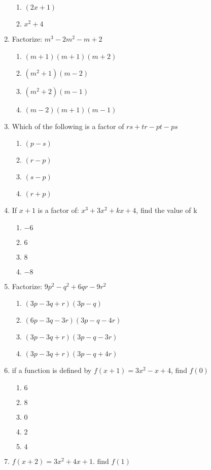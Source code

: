 \begin{multicols}{2}
\begin{enumerate}[label={\arabic*.}]
\begin{enumerate}[label={\Alph*.}]
	\item \((2x+1)\)
	\item \({x}^{2}+4\)
	\end{enumerate}
\item Factorize: \(m^3-2m^2-m+2\)
	\begin{enumerate}[label={\Alph*.}]
	\item \((m+1)(m+1)(m+2)\)
	\item \((m^2+1)(m-2)\)
	\item \((m^2+2)(m-1)\)
	\item \((m-2)(m+1)(m-1)\)
	\end{enumerate}
\item Which of the following is a factor of \(rs+tr-pt-ps\)
	\begin{enumerate}[label={\Alph*.}]
	\item \((p-s)\)
	\item \((r-p)\)
	\item \((s-p)\)
	\item \((r+p)\)
	\end{enumerate}
\item If \(x+1\) is a factor of: \({x}^{3}+3{x}^{2}+kx+4\), find the value of k
	\begin{enumerate}[label={\Alph*.}]
	\item \(-6\)
	\item \(6\)
	\item \(8\)
	\item \(-8\)
	\end{enumerate}
\item Factorize: \(9p^2-q^2+6qr-9r^2\)
	\begin{enumerate}[label={\Alph*.}]
	\item \((3p-3q+r)(3p-q)\)
	\item \((6p-3q-3r)(3p-q-4r)\)
	\item \((3p-3q+r)(3p-q-3r)\)
	\item \((3p-3q+r)(3p-q+4r)\)
	\end{enumerate}
\item if a function is defined by $f(x+1) = 3x^2-x+4$, find $f(0)$
	\begin{enumerate}[label={\Alph*.}]
	\item \(6\)
	\item \(8\)
	\item \(0\)
	\item \(2\)
	\item \(4\)
	\end{enumerate}
\item $f(x+2) = 3x^2 + 4x + 1$. find $f(1)$

\end{enumerate}
\end{multicols}
